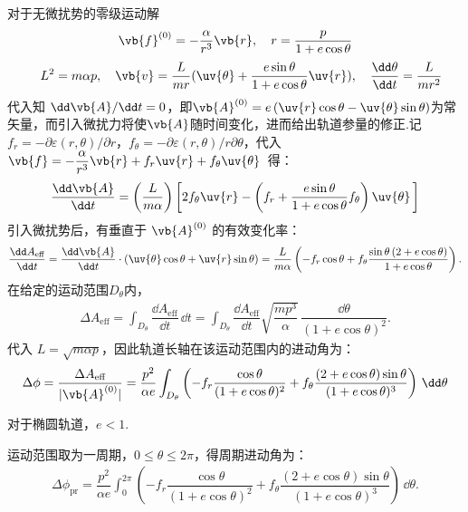 对于无微扰势的零级运动解
\begin{align*}
	\vb{f}^{(0)} = -\dfrac{\alpha}{r^3} \vb{r},\quad r=\frac{p}{1+e\cos\theta}
\end{align*}
\begin{align*}
	\quad L^2=m\alpha p,\quad \vb{v}=\frac{L}{mr}(\uv{\theta}+\frac{e\sin\theta}{1+e\cos\theta}\uv{r}),\quad \frac{\dd \theta}{\dd t}=\frac{L}{mr^2}
\end{align*}
代入知 \(\dd \vb{A}/\dd t=0\)，即\(\vb{A}^{(0)} = e\, (\uv{r} \cos\theta - \uv{\theta} \sin\theta)\)为常矢量，而引入微扰力将使\(\vb{A}\)随时间变化，进而给出轨道参量的修正.记 \(f_r = -\partial\varepsilon(r,\theta)/\partial r\)，\(f_{\theta} = -\partial\varepsilon(r,\theta)/r\partial\theta\)，代入 \(\vb{f} = -\dfrac{\alpha}{r^3} \vb{r} + f_r \uv{r} + f_{\theta} \uv{\theta}\,\) 得：
\begin{align*}
	\dfrac{\dd \vb{A}}{\dd t} = \left( \dfrac{L}{m \alpha} \right) \left[ 2 f_{\theta} \uv{r} - \left( f_r + \dfrac{e \sin\theta}{1 + e \cos\theta} f_{\theta} \right) \uv{\theta} \,\right]
\end{align*}
引入微扰势后，有垂直于 \(\vb{A}^{(0)}\) 的有效变化率：
\begin{align*}
	\dfrac{\dd A_{\text{eff}}}{\dd t} = \dfrac{\dd \vb{A}}{\dd t} \cdot (\uv{\theta} \cos\theta + \uv{r} \sin\theta) = \dfrac{L}{m \alpha} \left( -f_r \cos\theta + f_{\theta} \dfrac{\sin\theta\, (2 + e \cos\theta)}{1 + e \cos\theta} \right).
\end{align*}
在给定的运动范围\(D_{\theta}\)内，
\begin{align*}
	\Delta A_{\text{eff}} = \int_{D_{\theta}} \dfrac{\dd A_{\text{eff}}}{\dd t} \, \dd t = \int_{D_{\theta}} \dfrac{\dd A_{\text{eff}}}{\dd t} \sqrt{\dfrac{m p^3}{\alpha}} \, \dfrac{\dd \theta}{(1 + e \cos\theta)^2}.
\end{align*}
代入 \(L = \sqrt{m\alpha p}\)，因此轨道长轴在该运动范围内的进动角为：
\begin{align*}
	\Delta \phi = \dfrac{\Delta A_{\text{eff}}}{|\vb{A}^{(0)}|} = \dfrac{p^2}{\alpha e} \int_{D_{\theta}} \left( -f_r \dfrac{\cos\theta}{(1 + e \cos\theta)^2} + f_{\theta} \dfrac{(2 + e \cos\theta) \sin\theta}{(1 + e \cos\theta)^3} \right) \, \dd \theta
\end{align*}

对于椭圆轨道，\(e < 1\).

运动范围取为一周期，\(0 \leq \theta \leq 2\pi\)，得周期进动角为：
\begin{align*}
	\Delta \phi_{\text{pr}} = \dfrac{p^2}{\alpha e} \int_{0}^{2\pi} \left( -f_r \dfrac{\cos\theta}{(1 + e \cos\theta)^2} + f_{\theta} \dfrac{(2 + e \cos\theta) \sin\theta}{(1 + e \cos\theta)^3} \right) \, \dd \theta.
\end{align*}

